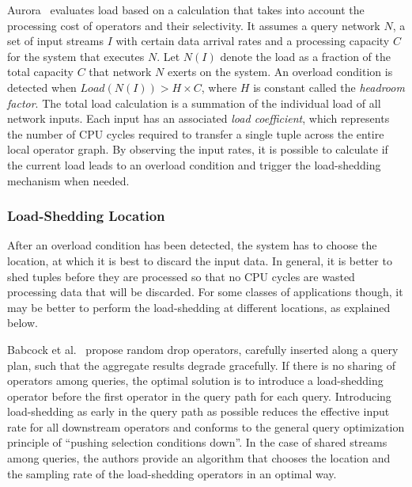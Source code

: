 Aurora~\cite{load-shedding} evaluates load based on a calculation that takes into account the
processing cost of operators and their selectivity. It assumes a query network $N$, a set of input
streams $I$ with certain data arrival rates and a processing capacity $C$ for the system that executes
$N$.
Let $N(I)$ denote the load as a fraction of the total capacity $C$ that network $N$ exerts on the
system.
An overload condition is detected when $Load(N(I)) > H \times C$, where $H$ is constant called the
\emph{headroom factor}. The total load calculation is a summation of the individual load
of all network inputs. Each input has an associated \emph{load coefficient}, which represents the number
of CPU cycles required to transfer a single tuple across the entire local operator graph. By observing
the input rates, it is possible to calculate if the current load leads to an overload condition and
trigger the \mbox{load-shedding} mechanism when needed. 
% 
% 
% 
% 
% 

\subsubsection*{\mbox{Load-Shedding} Location}

After an overload condition has been detected, the system has to choose the location, at which it is best
to discard the input data. In general, it is better to shed tuples before they are processed so that no
CPU cycles are wasted processing data that will be discarded. For some classes of
applications though, it may be better to perform the load-shedding at different locations, as explained
below.

Babcock et al.~\cite{loadshed-babcock} propose random drop operators, carefully inserted along a
query plan, such that the aggregate results degrade gracefully.
If there is no sharing of operators among queries, the optimal solution is to introduce a \mbox{load-shedding}
operator before the first operator in the query path for each query. Introducing load-shedding as early
in the query path as possible reduces the effective input rate for all downstream operators and conforms
to the general query optimization principle of ``pushing selection conditions down''.
In the case of shared streams among queries, the authors provide an algorithm that chooses the location
and the sampling rate of the \mbox{load-shedding} operators in an optimal way.

